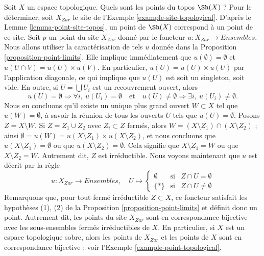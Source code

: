\begin{example}
\label{example-point-topology}
Soit $X$ un espace topologique. Quels sont les points du topos
$\Sh(X)$ ? Pour le déterminer, soit $X_{Zar}$ le site de
l’Exemple \ref{example-site-topological}.
D’après le
Lemme \ref{lemma-point-site-topos},
un point de $\Sh(X)$ correspond à un point de ce site.
Soit $p$ un point du site $X_{Zar}$ donné par le foncteur
$u : X_{Zar} \to \textit{Ensembles}$. Nous allons utiliser la
caractérisation de tels $u$ donnée dans la
Proposition \ref{proposition-point-limits}.
Elle implique immédiatement que $u(\emptyset) = \emptyset$ et
$u(U \cap V) = u(U) \times u(V)$. En particulier,
$u(U) = u(U) \times u(U)$ par l’application diagonale, ce qui implique que $u(U)$
est soit un singleton, soit vide. En outre, si $U = \bigcup U_i$ est un
recouvrement ouvert, alors
$$
u(U) = \emptyset \Rightarrow \forall i, \ u(U_i) = \emptyset
\quad\text{et}\quad
u(U) \not = \emptyset \Rightarrow \exists i, \ u(U_i) \not = \emptyset.
$$
Nous en concluons qu’il existe un unique plus grand ouvert $W \subset X$ tel que
$u(W) = \emptyset$, à savoir la réunion de tous les ouverts $U$ tels que
$u(U) = \emptyset$. Posons $Z = X \setminus W$. Si $Z = Z_1 \cup Z_2$ avec
$Z_i \subset Z$ fermés, alors $W = (X \setminus Z_1) \cap (X \setminus Z_2)$ ;
ainsi $\emptyset = u(W) = u(X \setminus Z_1) \times u(X \setminus Z_2)$,
et nous concluons que $u(X \setminus Z_1) = \emptyset$ ou que
$u(X \setminus Z_2) = \emptyset$. Cela signifie que $X \setminus Z_1 = W$
ou que $X \setminus Z_2 = W$. Autrement dit, $Z$ est irréductible.
Nous voyons maintenant que $u$ est décrit par la règle
$$
u : X_{Zar} \longrightarrow \textit{Ensembles}, \quad
U \mapsto
\left\{
\begin{matrix}
\emptyset & \text{si} & Z \cap U = \emptyset \\
\{*\} & \text{si} & Z \cap U \not = \emptyset
\end{matrix}
\right.
$$
Remarquons que, pour tout fermé irréductible $Z \subset X$, ce
foncteur satisfait les hypothèses (1), (2) de la
Proposition \ref{proposition-point-limits}
et définit donc un point. Autrement dit, les points du
site $X_{Zar}$ sont en correspondance bijective avec les
sous-ensembles fermés irréductibles de $X$. En particulier, si $X$ est
un espace topologique sobre, alors les points de $X_{Zar}$ et les
points de $X$ sont en correspondance bijective ; voir
l’Exemple \ref{example-point-topological}.
\end{example}

